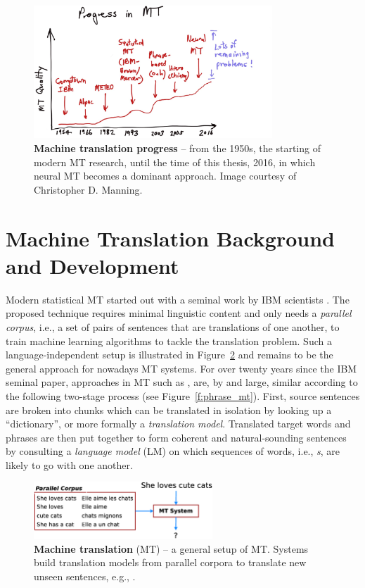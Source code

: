\begin{figure}[tbh!]
\centering
\includegraphics[width=0.8\textwidth, clip=true, trim= 0 0 0
80]{img/MT_progress} %
\caption[Machine translation progress]{{\bf Machine translation progress} --
from the 1950s, the starting of modern MT research, until the time of this
thesis, 2016, in which neural MT becomes a dominant approach. Image courtesy of
Christopher D. Manning.
} 
\label{f:mt_progress}
\end{figure}


\section{Machine Translation Background and Development}
Modern
statistical MT started out with a seminal work by IBM scientists
\cite{Brown:1993:MSM}. The proposed technique requires minimal linguistic
content and only needs a {\it parallel corpus}, i.e., a set of pairs of sentences that are translations of one
another, to train machine learning algorithms to tackle the translation problem.
Such a language-independent setup is illustrated in Figure~\ref{f:mt} and remains
to be the general approach for nowadays MT systems.
For over twenty years since the IBM seminal paper, approaches in MT
such as
\cite{Koehn:2003:SMT,och03,Liang:2006:EDA,koehn2007moses,chiang07hiero,dyer10cdec,cer10phrasal},
are, by and large, similar according to the following two-stage
process (see Figure~\ref{f:phrase_mt}). First, source sentences are broken into
chunks which can be translated in isolation by looking up a ``dictionary'', or
more formally a {\it translation model}. Translated target words and phrases
are then put together to form coherent and natural-sounding sentences by consulting a
{\it language model} (LM) on which sequences of words, i.e., {\it \ngram{}s}, are
likely to go with one another.
\begin{figure}
\centering
\includegraphics[width=0.6\textwidth, clip=true, trim= 0 0 0 0]{img/mt.eps} %
\caption[A general setup of machine translation]{{\bf Machine translation} (MT) -- a general setup of MT. Systems
build translation models from parallel corpora to translate new unseen
sentences, e.g., .}
\label{f:mt}
\end{figure}


